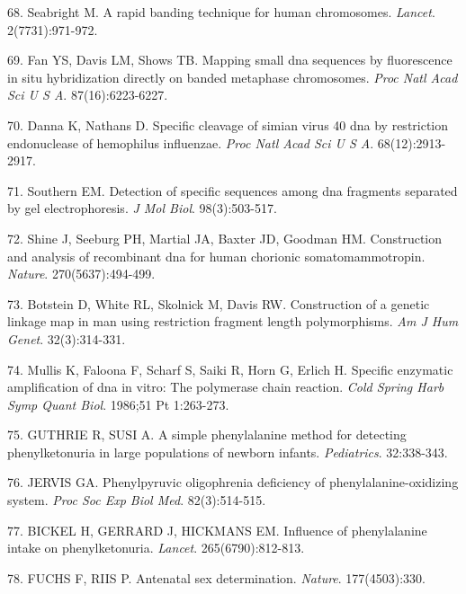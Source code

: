 \documentclass[11pt,letterpaper]{book}
\begin{document}
\leavevmode\hypertarget{ref-seabright:1971aa}{}%
68. Seabright M. A rapid banding technique for human chromosomes. \emph{Lancet}. 2(7731):971-972.

\leavevmode\hypertarget{ref-fan:1990aa}{}%
69. Fan YS, Davis LM, Shows TB. Mapping small dna sequences by fluorescence in situ hybridization directly on banded metaphase chromosomes. \emph{Proc Natl Acad Sci U S A}. 87(16):6223-6227.

\leavevmode\hypertarget{ref-danna:1971aa}{}%
70. Danna K, Nathans D. Specific cleavage of simian virus 40 dna by restriction endonuclease of hemophilus influenzae. \emph{Proc Natl Acad Sci U S A}. 68(12):2913-2917.

\leavevmode\hypertarget{ref-southern:1975aa}{}%
71. Southern EM. Detection of specific sequences among dna fragments separated by gel electrophoresis. \emph{J Mol Biol}. 98(3):503-517.

\leavevmode\hypertarget{ref-shine:1977aa}{}%
72. Shine J, Seeburg PH, Martial JA, Baxter JD, Goodman HM. Construction and analysis of recombinant dna for human chorionic somatomammotropin. \emph{Nature}. 270(5637):494-499.

\leavevmode\hypertarget{ref-botstein:1980aa}{}%
73. Botstein D, White RL, Skolnick M, Davis RW. Construction of a genetic linkage map in man using restriction fragment length polymorphisms. \emph{Am J Hum Genet}. 32(3):314-331.

\leavevmode\hypertarget{ref-mullis:1986aa}{}%
74. Mullis K, Faloona F, Scharf S, Saiki R, Horn G, Erlich H. Specific enzymatic amplification of dna in vitro: The polymerase chain reaction. \emph{Cold Spring Harb Symp Quant Biol}. 1986;51 Pt 1:263-273.

\leavevmode\hypertarget{ref-guthrie:1963aa}{}%
75. GUTHRIE R, SUSI A. A simple phenylalanine method for detecting phenylketonuria in large populations of newborn infants. \emph{Pediatrics}. 32:338-343.

\leavevmode\hypertarget{ref-jervis:1953aa}{}%
76. JERVIS GA. Phenylpyruvic oligophrenia deficiency of phenylalanine-oxidizing system. \emph{Proc Soc Exp Biol Med}. 82(3):514-515.

\leavevmode\hypertarget{ref-bickel:1953aa}{}%
77. BICKEL H, GERRARD J, HICKMANS EM. Influence of phenylalanine intake on phenylketonuria. \emph{Lancet}. 265(6790):812-813.

\leavevmode\hypertarget{ref-fuchs:1956aa}{}%
78. FUCHS F, RIIS P. Antenatal sex determination. \emph{Nature}. 177(4503):330.
\end{document}
